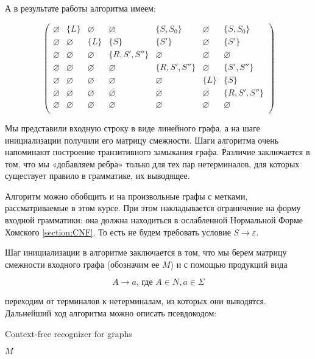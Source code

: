 А в результате работы алгоритма имеем:

\[
\begin{pmatrix}
\varnothing & \{L\}  	  & \varnothing & \varnothing    & \{S, S_0\}	  & \varnothing & \{S, S_0\} 	 \\
\varnothing & \varnothing & \{L\} 	    & \{S\}  		 & \{S'\}  		  & \varnothing & \{S'\}	 	 \\
\varnothing & \varnothing & \varnothing & \{R, S', S''\} & \varnothing 	  & \varnothing & \varnothing 	 \\
\varnothing & \varnothing & \varnothing & \varnothing    & \{R, S', S''\} & \varnothing & \{S', S''\}	 \\
\varnothing & \varnothing & \varnothing & \varnothing    & \varnothing 	  & \{L\} 	    & \{S\}	 		 \\
\varnothing & \varnothing & \varnothing & \varnothing    & \varnothing 	  & \varnothing & \{R, S', S''\} \\
\varnothing & \varnothing & \varnothing & \varnothing    & \varnothing 	  & \varnothing & \varnothing	 \\
\end{pmatrix}
\]

Мы представили входную строку в виде линейного графа, а на шаге инициализации получили его матрицу смежности. Шаги алгоритма очень напоминают построение транзитивного замыкания графа. Различие заключается в том, что мы «добавляем ребра» только для тех пар нетерминалов, для которых существует правило в грамматике, их выводящее. 

Алгоритм можно обобщить и на произвольные графы с метками, рассматриваемые в этом курсе. При этом накладывается ограничение на форму входной грамматики: она должна находиться в ослабленной Нормальной Форме Хомского \ref{section:CNF}. То есть не будем требовать условие $S \to \varepsilon$.

Шаг инициализации в алгоритме заключается в том, что мы берем матрицу смежности входного графа (обозначим ее $M$) и с помощью продукций вида 

\[A \to a \text{, где } A \in N, a \in \Sigma\]

переходим от терминалов к нетерминалам, из которых они выводятся. Дальнейший ход алгоритма можно описать псевдокодом:

\begin{algorithm}[H]
	\begin{algorithmic}[1]
		\caption{Context-free recognizer for graphs}
		\label{alg:graphParse}
		
						\EndIf
					\EndFor 
				\EndFor
			\EndFor 
		\EndFor 
		\State \Return $M$
		\EndFunction
	\end{algorithmic}
\end{algorithm}

